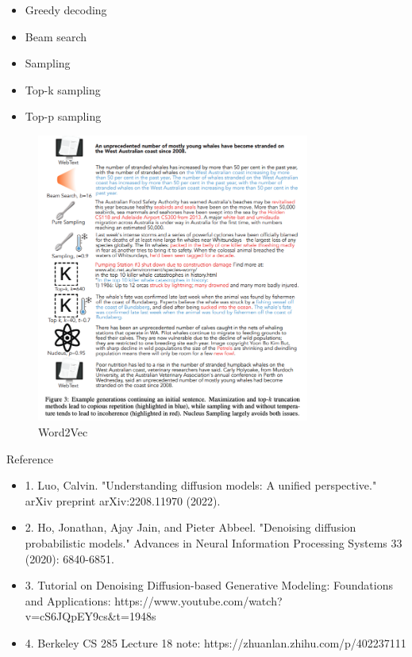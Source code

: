 \documentclass{beamer}
\begin{document}
\begin{frame}
	\begin{itemize}
		\item Greedy decoding
		\item Beam search
		\item Sampling
		\item Top-k sampling
		\item Top-p sampling
	\end{itemize}
	\begin{figure}
		\centering
		\includegraphics[width=0.8\textwidth]{fig/decoding.png}
		\caption{Word2Vec}
	\end{figure}
\end{frame}

\begin{frame}{Reference}
	\begin{itemize}
		\item 1. Luo, Calvin. "Understanding diffusion models: A unified perspective." arXiv preprint arXiv:2208.11970 (2022).
		\item 2. Ho, Jonathan, Ajay Jain, and Pieter Abbeel. "Denoising diffusion probabilistic models." Advances in Neural Information Processing Systems 33 (2020): 6840-6851.
		\item 3. Tutorial on Denoising Diffusion-based Generative Modeling: Foundations and Applications: https://www.youtube.com/watch?v=cS6JQpEY9cs\&t=1948s
		\item 4. Berkeley CS 285 Lecture 18 note: https://zhuanlan.zhihu.com/p/402237111
	\end{itemize}

\end{frame}
\end{document}
